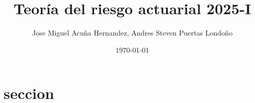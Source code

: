 \documentclass{article}
\title{ Teoría del riesgo actuarial 2025-I}
\author{Jose Miguel Acuña Hernandez, Andres Steven Puertas Londoño}
\date{\today}
\begin{document}
\renewcommand{\thesection}{\Alph{section}}
\thispagestyle{firstpage}
\vspace*{9\baselineskip}
\graphicspath{ {./figures/} }


\renewcommand{\contentsname}{}
\begin{cuadrocontenido}
  \tableofcontents
\end{cuadrocontenido}

\section{seccion}

\subsection{}

\end{document}
